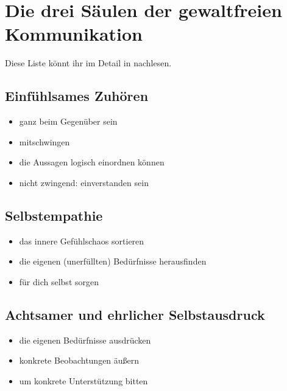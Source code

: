 \section{Die drei Säulen der gewaltfreien Kommunikation}
\label{saeulen}

Diese Liste könnt ihr im Detail in \cite[S. 33f]{gfk-dummies} nachlesen.


\subsection{Einfühlsames Zuhören}

\begin{itemize}
 \item ganz beim Gegenüber sein
 \item mitschwingen
 \item die Aussagen logisch einordnen können
 \item nicht zwingend: einverstanden sein
\end{itemize}


\subsection{Selbstempathie}

\begin{itemize}
 \item das innere Gefühlschaos sortieren
 \item die eigenen (unerfüllten) Bedürfnisse herausfinden
 \item für dich selbst sorgen
\end{itemize}


\subsection{Achtsamer und ehrlicher Selbstausdruck}

\begin{itemize}
 \item die eigenen Bedürfnisse ausdrücken
 \item konkrete Beobachtungen äußern
 \item um konkrete Unterstützung bitten
\end{itemize}
